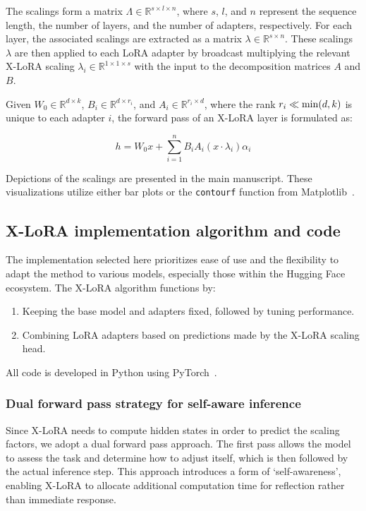 The scalings form a matrix $\Lambda \in \mathbb{R}^{s \times l \times n}$, where $s$, $l$, and $n$ represent the sequence length, the number of layers, and the number of adapters, respectively. For each layer, the associated scalings are extracted as a matrix $\lambda \in \mathbb{R}^{s \times n}$. These scalings $\lambda$ are then applied to each LoRA adapter by broadcast multiplying the relevant X-LoRA scaling $\lambda_i \in \mathbb{R}^{1\times 1 \times s}$ with the input to the decomposition matrices $A$ and $B$.

Given $W_0 \in \mathbb{R}^{d \times k}$, $B_i \in \mathbb{R}^{d \times r_i}$, and $A_i \in \mathbb{R}^{r_i \times d}$, where the rank $r_i \ll {\rm min} (d,k)$ is unique to each adapter $i$, the forward pass of an X-LoRA layer is formulated as:

\begin{equation}
    h = W_0x + \sum_{i=1}^{n} B_iA_i(x \cdot  \lambda_i) \alpha_i
\end{equation}

Depictions of the scalings are presented in the main manuscript. These visualizations utilize either bar plots or the \texttt{contourf} function from Matplotlib~\cite{MatplotlibDocumentation}.

\subsection{X-LoRA implementation algorithm and code} The implementation selected here prioritizes ease of use and the flexibility to adapt the method to various models, especially those within the Hugging Face ecosystem. The X-LoRA algorithm functions by:

\begin{enumerate}
    \item Keeping the base model and adapters fixed, followed by tuning performance.
    \item Combining LoRA adapters based on predictions made by the X-LoRA scaling head.
\end{enumerate}

All code is developed in Python using PyTorch~\cite{Paszke2019PyTorchLibrary}. 

\subsubsection{Dual forward pass strategy for self-aware inference} Since X-LoRA needs to compute hidden states in order to predict the scaling factors, we adopt a dual forward pass approach. The first pass allows the model to assess the task and determine how to adjust itself, which is then followed by the actual inference step. This approach introduces a form of `self-awareness', enabling X-LoRA to allocate additional computation time for reflection rather than immediate response.

